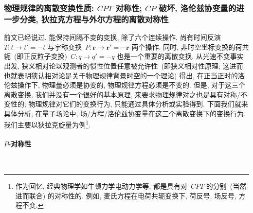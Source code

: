 \subsubsection{物理规律的离散变换性质: $CPT$ 对称性; $CP$ 破坏, 洛伦兹协变量的进一步分类, 狄拉克方程与外尔方程的离散对称性}



前文已经说过, 能保持间隔不变的变换, 除了六个连续操作, 尚有时间反演~$T:t\rightarrow t'=-t$ 与宇称变换~$P:\bm{r}\rightarrow \bm{r}'=-\bm{r}$ 两个操作. 同时, 非时空坐标变换的荷共轭~(即正反粒子变换)~$C:q\rightarrow q'=-q$ 也是一个重要的离散变换. 从光速不变事实出发, 狭义相对论以观测者的惯性位置任意被允许性~(即狭义相对性原理; 这进而也就表明狭认相对论是关于物理规律背景时空的一个理论) 得出, 在正当正时的洛伦兹操作下, 物理量必须是协变的, 物理规律方程必须是不变的. 但是, 对于这三个离散变换, 我们并没有一个很好的基本原理, 来要求物理规律对之也是具有对称/不变性的; 物理规律对它们的变换行为, 只能通过具体分析或实验得到. 下面我们就来具体分析, 在量子场论中, 场/方程/洛伦兹协变量在这三个离散变换下的变换行为. 我们主要以狄拉克旋量为例\footnote{作为回忆, 经典物理学如牛顿力学电动力学等, 都是具有对~$CPT$ 的分别~(当然进而联合) 的对称性的. 例如, 麦氏方程在电荷共轭变换下, 荷反号, 场反号, 方程不变.}. %





\paragraph{$P$-对称性}
~

